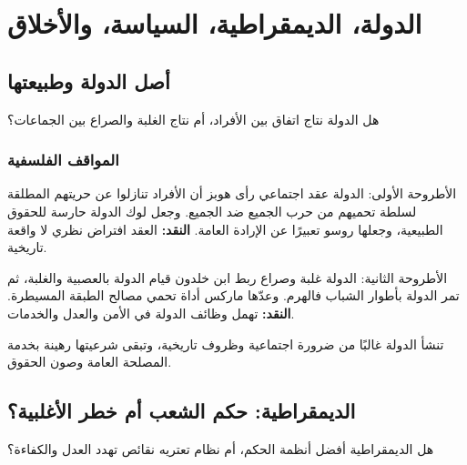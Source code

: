 \documentclass[12pt, twoside, openright]{book}
\newcommand{\setchap}[1]{\colorlet{chapcol}{#1}}
\begin{document}
\setchap{colB}
\chapter{الدولة، الديمقراطية، السياسة، والأخلاق}

\section{أصل الدولة وطبيعتها}
\begin{problembox}
هل الدولة نتاج اتفاق بين الأفراد، أم نتاج الغلبة والصراع بين الجماعات؟
\end{problembox}
\subsection*{المواقف الفلسفية}
\begin{positionbox}{الأطروحة الأولى: الدولة عقد اجتماعي}
رأى هوبز أن الأفراد تنازلوا عن حريتهم المطلقة لسلطة تحميهم من حرب الجميع ضد الجميع. وجعل لوك الدولة حارسة للحقوق الطبيعية، وجعلها روسو تعبيرًا عن الإرادة العامة. \textbf{النقد:} العقد افتراض نظري لا واقعة تاريخية.
\end{positionbox}
\begin{positionbox}{الأطروحة الثانية: الدولة غلبة وصراع}
ربط ابن خلدون قيام الدولة بالعصبية والغلبة، ثم تمر الدولة بأطوار الشباب فالهرم. وعدّها ماركس أداة تحمي مصالح الطبقة المسيطرة. \textbf{النقد:} تهمل وظائف الدولة في الأمن والعدل والخدمات.
\end{positionbox}
\begin{synthbox}
تنشأ الدولة غالبًا من ضرورة اجتماعية وظروف تاريخية، وتبقى شرعيتها رهينة بخدمة المصلحة العامة وصون الحقوق.
\end{synthbox}

\section{الديمقراطية: حكم الشعب أم خطر الأغلبية؟}
\begin{problembox}
هل الديمقراطية أفضل أنظمة الحكم، أم نظام تعتريه نقائص تهدد العدل والكفاءة؟
\end{problembox}
\end{document}
